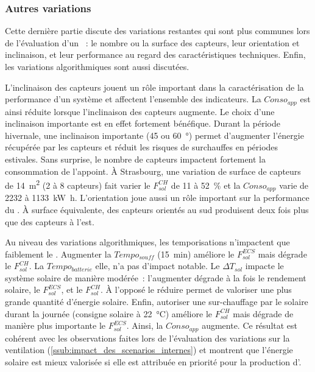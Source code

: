\subsubsection{Autres variations} %
\label{ssub:autres_variations}
Cette dernière partie discute des variations restantes qui sont plus communes lors
de l’évaluation d’un ~: le nombre ou la surface des capteurs, leur
orientation et inclinaison, et leur performance au regard des caractéristiques techniques.
Enfin, les variations algorithmiques sont aussi discutées.

L’inclinaison des capteurs jouent un rôle important dans la caractérisation de la
performance d’un système  et affectent l’ensemble des indicateurs. La $Conso_{app}$
est ainsi réduite lorsque l’inclinaison des capteurs augmente. Le choix d’une inclinaison
importante est en effet fortement bénéfique. Durant la période hivernale, une inclinaison
importante (\num{45} ou \SI{60}{\degree}) permet d’augmenter l’énergie récupérée par les
capteurs et réduit les risques de surchauffes en périodes estivales. Sans surprise, le
nombre de capteurs impactent fortement la consommation de l’appoint. À Strasbourg, une
variation de surface de capteurs de \SI{14}{\meter\squared} (\num{2} à \num{8} capteurs)
fait varier le $F_{sol}^{CH}$ de \num{11} à \SI{52}{\percent} et la $Conso_{app}$ varie de
\num{2232} à \SI{1133}{\kilo\watt\hour}. L’orientation joue aussi un rôle important sur la
performance du . À surface équivalente, des capteurs orientés au sud produisent deux
fois plus que des capteurs à l’est.

Au niveau des variations algorithmiques, les temporisations n’impactent que faiblement
le . Augmenter la $Tempo_{souff}$ (\SI{15}{min}) améliore le $F_{sol}^{ECS}$ mais dégrade
le $F_{sol}^{CH}$. La $Tempo_{batterie}$ elle, n’a pas d’impact notable. Le $\Delta T_{sol}$
impacte le système solaire de manière modérée~: l’augmenter dégrade à la fois le rendement
solaire, le $F_{sol}^{ECS}$, et le $F_{sol}^{CH}$. À l’opposé le réduire permet de valoriser une plus
grande quantité d’énergie solaire. Enfin, autoriser une sur-chauffage par le solaire
durant la journée (consigne solaire à \SI{22}{\celsius}) améliore le $F_{sol}^{CH}$ mais dégrade
de manière plus importante le $F_{sol}^{ECS}$. Ainsi, la $Conso_{app}$ augmente. Ce résultat est
cohérent avec les observations faites lors de l’évaluation des variations sur la
ventilation (\ref{ssub:impact_des_scenarios_internes}) et montrent que l’énergie solaire
est mieux valorisée si elle est attribuée en priorité pour la production d’.

